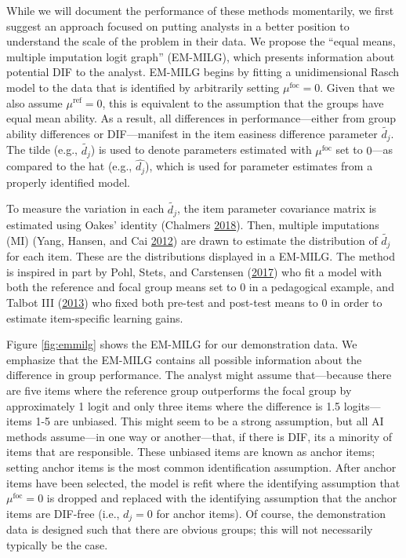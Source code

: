 \documentclass[
  11pt,
]{article}
\begin{document}
While we will document the performance of these methods momentarily, we first suggest an approach focused on putting analysts in a better position to understand the scale of the problem in their data. We propose the \enquote{equal means, multiple imputation logit graph} (EM-MILG), which presents information about potential DIF to the analyst. EM-MILG begins by fitting a unidimensional Rasch model to the data that is identified by arbitrarily setting \(\mu^\text{foc} = 0\). Given that we also assume \(\mu^\text{ref} = 0\), this is equivalent to the assumption that the groups have equal mean ability. As a result, all differences in performance---either from group ability differences or DIF---manifest in the item easiness difference parameter \(\tilde{d_j}\). The tilde (e.g., \(\tilde{d_j}\)) is used to denote parameters estimated with \(\mu^\text{foc}\) set to \(0\)---as compared to the hat (e.g., \(\hat{d_j}\)), which is used for parameter estimates from a properly identified model.

To measure the variation in each \(\tilde{{d_j}}\), the item parameter covariance matrix is estimated using Oakes' identity (Chalmers \protect\hyperlink{ref-chalmers2018numerical}{2018}). Then, multiple imputations (MI) (Yang, Hansen, and Cai \protect\hyperlink{ref-yang2012characterizing}{2012}) are drawn to estimate the distribution of \(\tilde{d_j}\) for each item. These are the distributions displayed in a EM-MILG. The method is inspired in part by Pohl, Stets, and Carstensen (\protect\hyperlink{ref-pohl2017cluster}{2017}) who fit a model with both the reference and focal group means set to 0 in a pedagogical example, and Talbot III (\protect\hyperlink{ref-talbot2013taking}{2013}) who fixed both pre-test and post-test means to 0 in order to estimate item-specific learning gains.

Figure \ref{fig:emmilg} shows the EM-MILG for our demonstration data. We emphasize that the EM-MILG contains all possible information about the difference in group performance. The analyst might assume that---because there are five items where the reference group outperforms the focal group by approximately 1 logit and only three items where the difference is 1.5 logits---items 1-5 are unbiased. This might seem to be a strong assumption, but all AI methods assume---in one way or another---that, if there is DIF, its a minority of items that are responsible. These unbiased items are known as anchor items; setting anchor items is the most common identification assumption. After anchor items have been selected, the model is refit where the identifying assumption that \(\mu^\text{foc} = 0\) is dropped and replaced with the identifying assumption that the anchor items are DIF-free (i.e., \(d_j = 0\) for anchor items). Of course, the demonstration data is designed such that there are obvious groups; this will not necessarily typically be the case.
\end{document}
